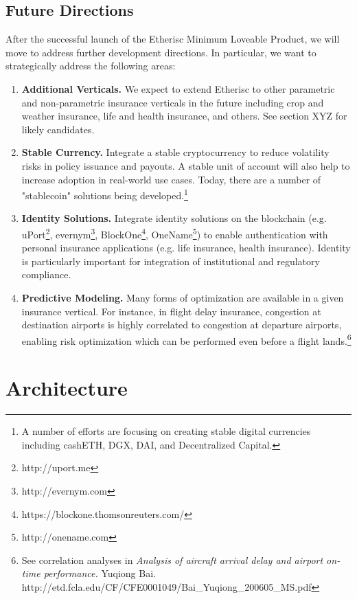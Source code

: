 \documentclass[12pt]{article}
\begin{document}
\subsection{Future Directions}

After the successful launch of the Etherisc Minimum Loveable Product, we will move to address further development directions. In particular, we want to strategically address the following areas:

\begin{enumerate}
    \item \textbf{Additional Verticals.} We expect to extend Etherisc to other parametric and non-parametric insurance verticals in the future including crop and weather insurance, life and health insurance, and others. See section XYZ for likely candidates.
    \item \textbf{Stable Currency.} Integrate a stable cryptocurrency to reduce volatility risks in policy issuance and payouts. A stable unit of account will also help to increase adoption in real-world use cases. Today, there are a number of "stablecoin" solutions being developed.\footnote{A number of efforts are focusing on creating stable digital currencies including cashETH, DGX, DAI, and Decentralized Capital.}
    \item \textbf{Identity Solutions.} Integrate identity solutions on the blockchain (e.g. uPort\footnote{http://uport.me}, evernym\footnote{http://evernym.com}, BlockOne\footnote{https://blockone.thomsonreuters.com/}, OneName\footnote{http://onename.com}) to enable authentication with personal insurance applications (e.g. life insurance, health insurance). Identity is particularly important for integration of institutional and regulatory compliance.
    \item \textbf{Predictive Modeling.} Many forms of optimization are available in a given insurance vertical. For instance, in flight delay insurance, congestion at destination airports is highly correlated to congestion at departure airports, enabling risk optimization which can be performed even before a flight lands.\footnote{See correlation analyses in \textit{Analysis of aircraft arrival delay and airport on-time performance.} Yuqiong Bai. http://etd.fcla.edu/CF/CFE0001049/Bai\_Yuqiong\_200605\_MS.pdf}
\end{enumerate}

\section{Architecture}
\end{document}
